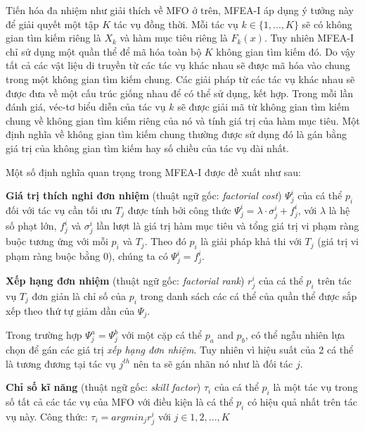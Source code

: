 \label{mfeai}

Tiến hóa đa nhiệm như giải thích về MFO ở trên, MFEA-I áp dụng ý tưởng này để giải quyết một tập $K$ tác vụ đồng thời. Mỗi tác vụ $k \in \{1, ..., K\}$ sẽ có không gian tìm kiếm riêng là $X_k$ và hàm mục tiêu riêng là $F_k(x)$. Tuy nhiên MFEA-I chỉ sử dụng một quần thể để mã hóa toàn bộ $K$ không gian tìm kiếm đó. Do vậy tất cả các vật liệu di truyền từ các tác vụ khác nhau sẽ được mã hóa vào chung trong một không gian tìm kiếm chung. Các giải pháp từ các tác vụ khác nhau sẽ được đưa về một cấu trúc giống nhau để có thể sử dụng, kết hợp. Trong mỗi lần đánh giá, véc-tơ biểu diễn của tác vụ $k$ sẽ được giải mã từ không gian tìm kiếm chung về không gian tìm kiếm riêng của nó và tính giá trị của hàm mục tiêu. Một định nghĩa về không gian tìm kiếm chung thường được sử dụng đó là gán bằng giá trị của không gian tìm kiếm hay số chiều của tác vụ dài nhất. 

Một số định nghĩa quan trọng trong MFEA-I được đề xuất như sau:

\begin{definition}{\textbf{Giá trị thích nghi đơn nhiệm}} (thuật ngữ gốc: \emph{factorial cost}) $\Psi^i_j$ của cá thể $p_i$ đối với tác vụ cần tối ưu $T_j$ được tính bởi công thức $\Psi^i_j=\lambda\cdot\sigma^i_j +f^i_j$, với $\lambda$ là hệ số phạt lớn, $f^i_j$ và $\sigma^i_j$ lần lượt là giá trị hàm mục tiêu và tổng giá trị vi phạm ràng buộc tương ứng với mỗi $p_i$ và $T_j$. Theo đó $p_i$ là giải pháp khả thi với $T_j$ (giá trị vi phạm ràng buộc bằng 0), chúng ta có $\Psi^i_j=f^i_j$.
\label{def:factorial_cost}
\end{definition}

\begin{definition}{\textbf{Xếp hạng đơn nhiệm}} (thuật ngữ gốc: \emph{factorial rank}) $r^i_j$ của cá thể $p_i$ trên tác vụ $T_j$ đơn giản là chỉ số của $p_i$ trong danh sách các cá thể của quần thể được sắp xếp theo thứ tự giảm dần của $\Psi_j$.
\label{def:factorial_rank}
\end{definition}


Trong trường hợp $\Psi^a_j=\Psi^b_j$ với một cặp cá thể $p_a$ and $p_b$, có thể ngẫu nhiên lựa chọn để gán các giá trị \emph{xếp hạng đơn nhiệm}. Tuy nhiên vì hiệu suất của 2 cá thể là tương đương tại tác vụ $j^{th}$ nên ta sẽ gán nhãn nó như là đối tác $j$.
\begin{definition}{\textbf{Chỉ số kĩ năng}} (thuật ngữ gốc: \emph{skill factor}) $\tau_i$ của cá thể $p_i$ là một tác vụ trong số tất cả các tác vụ của MFO với điều kiện là cá thể $p_i$ có hiệu quả nhất trên tác vụ này. Công thức: $\tau_i = argmin_j{r^i_j}$ với $j \in {1, 2, ..., K}$
\label{def:skill_factor}
\end{definition}

